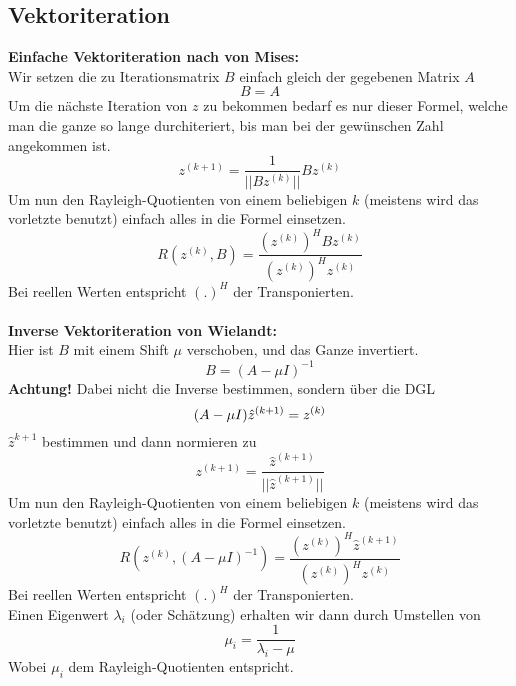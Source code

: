 \documentclass[
ngerman,
accentcolor=9c,%
type=intern,
marginpar=false
]{tudapub}
\begin{document}
        \subsection{Vektoriteration}
            \textbf{Einfache Vektoriteration nach von Mises:}\\
            Wir setzen die zu Iterationsmatrix $B$ einfach gleich der gegebenen Matrix $A$
            \begin{equation*}
                B = A
            \end{equation*}
            Um die nächste Iteration von $z$ zu bekommen bedarf es nur dieser Formel, welche man die ganze so lange durchiteriert, bis man bei der gewünschen Zahl angekommen ist.
            \begin{equation*}
                z^{(k+1)} = \dfrac{1}{||Bz^{(k)}||}Bz^{(k)}
            \end{equation*}
            Um nun den Rayleigh-Quotienten von einem beliebigen $k$ (meistens wird das vorletzte benutzt) einfach alles in die Formel einsetzen.
            \begin{equation*}
                R(z^{(k)},B)=\dfrac{(z^{(k)})^H Bz^{(k)}}{(z^{(k)})^Hz^{(k)}}
            \end{equation*}
            Bei reellen Werten entspricht $(.)^H$ der Transponierten.\\
            \\
            \textbf{Inverse Vektoriteration von Wielandt:}\\
            Hier ist $B$ mit einem Shift $\mu$ verschoben, und das Ganze invertiert.
            \begin{equation*}
                B = (A-\mu I)^{-1}
            \end{equation*}
            \textbf{Achtung!} Dabei nicht die Inverse bestimmen, sondern über die DGL
            \begin{equation*}
                (A-\mu I)\hat{z}^{(k+1)} = z^{(k)}\\
            \end{equation*}
            $\hat{z}^{k+1}$ bestimmen und dann normieren zu
            \begin{equation*}
                z^{(k+1)} = \dfrac{\hat{z}^{(k+1)}}{||\hat{z}^{(k+1)}||}
            \end{equation*}
            Um nun den Rayleigh-Quotienten von einem beliebigen $k$ (meistens wird das vorletzte benutzt) einfach alles in die Formel einsetzen.
            \begin{equation*}
                R(z^{(k)}, (A - \mu I)^{-1}) = \dfrac{(z^{(k)})^H\hat{z}^{(k+1)}}{(z^{(k)})^Hz^{(k)}}
            \end{equation*}
            Bei reellen Werten entspricht $(.)^H$ der Transponierten.\\
            Einen Eigenwert $\lambda_i$ (oder Schätzung) erhalten wir dann durch Umstellen von
            \begin{equation*}
                \mu_i = \dfrac{1}{\lambda_i - \mu}
            \end{equation*}
            Wobei $\mu_i$ dem Rayleigh-Quotienten entspricht.
    \newpage
\end{document}
